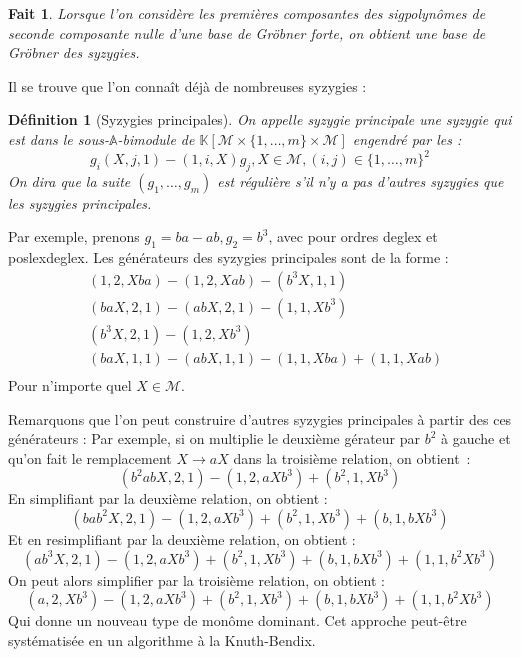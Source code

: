 \documentclass{article}
\newtheorem*{fact}{Fait}
\newtheorem*{dfn}{Définition}
\newcommand{\K}{\mathbb{K}}
\newcommand{\A}{\mathbb{A}}
\newcommand{\M}{\mathcal{M}}
\newcommand{\CR}{\K[\M\times\{1, \dots, m\}\times\M]}
\begin{document}
\begin{fact}
Lorsque l'on considère les premières composantes des sigpolynômes de seconde composante nulle d'une base de Gröbner forte, on obtient une base de Gröbner des syzygies.
\end{fact}

Il se trouve que l'on connaît déjà de nombreuses syzygies :

\begin{dfn}[Syzygies principales]
	On appelle syzygie principale une syzygie qui est dans le sous-$\A$-bimodule de $\CR$ engendré par les :
	$$g_i(X, j, 1) - (1, i, X)g_j, X \in \M, (i, j) \in \{1, \dots, m\}^2$$
	On dira que la suite $(g_1, \dots, g_m)$ est régulière s'il n'y a pas d'autres syzygies que les syzygies principales.
	
\end{dfn}

Par exemple, prenons $g_1 = ba - ab, g_2 = b^3$, avec pour ordres deglex et poslexdeglex.
Les générateurs des syzygies principales sont de la forme :
\begin{align*}
& (1, 2, Xba) - (1, 2, Xab) - (b^3X, 1, 1) \\
& (baX, 2, 1) - (abX, 2, 1) - (1, 1, Xb^3) \\
& (b^3X, 2, 1) - (1, 2, Xb^3) \\
& (baX, 1, 1) - (abX, 1, 1) - (1, 1, Xba) + (1, 1, Xab) \\
\end{align*}
Pour n'importe quel $X \in \M$.

Remarquons que l'on peut construire d'autres syzygies principales à partir des ces générateurs :
Par exemple, si on multiplie le deuxième gérateur par $b^2$ à gauche et qu'on fait le remplacement $X \rightarrow aX$ dans la troisième relation, on obtient~:
$$(b^2abX, 2, 1) - (1, 2, aXb^3) + (b^2, 1, Xb^3) $$
En simplifiant par la deuxième relation, on obtient :
$$(bab^2X, 2, 1) - (1, 2, aXb^3) + (b^2, 1, Xb^3) + (b, 1, bXb^3)$$
Et en resimplifiant par la deuxième relation, on obtient :
$$(ab^3X, 2, 1) - (1, 2, aXb^3) + (b^2, 1, Xb^3) + (b, 1, bXb^3) + (1, 1, b^2Xb^3)$$
On peut alors simplifier par la troisième relation, on obtient :
$$(a, 2, Xb^3) - (1, 2, aXb^3) + (b^2, 1, Xb^3) + (b, 1, bXb^3) + (1, 1, b^2Xb^3)$$
Qui donne un nouveau type de monôme dominant. Cet approche peut-être systématisée en un algorithme à la Knuth-Bendix.
\end{document}
